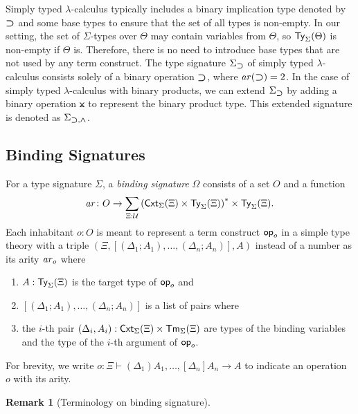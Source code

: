\documentclass[acmsmall,screen]{acmart}
\theoremstyle{acmdefinition}
\newtheorem{remark}[theorem]{Remark}}
\begin{document}
\begin{example}\label{ex:implication}
  Simply typed $\lambda$-calculus typically includes a binary implication type denoted by $\mathbin{\bm{\supset}}$ and some base types to ensure that the set of all types is non-empty.
  In our setting, the set of $\Sigma$-types over $\Theta$ may contain variables from $\Theta$, so $\mathsf{Ty}_{\Sigma}(\Theta)$ is non-empty if $\Theta$ is.
  Therefore, there is no need to introduce base types that are not used by any term construct.
  The type signature $\Sigma_{\mathbin{\bm{\supset}}}$ of simply typed $\lambda$-calculus consists solely of a binary operation $\mathbin{\bm{\supset}}$, where $\mathit{ar}(\mathbin{\bm{\supset}}) = 2$.
  In the case of simply typed $\lambda$-calculus with binary products, we can extend $\Sigma_{\mathbin{\bm{\supset}}}$ by adding a binary operation $\btimes$ to represent the binary product type.
  This extended signature is denoted as $\Sigma_{\mathbin{\bm{\supset}}, \mathbin{\bm{\wedge}}}$.
\end{example}


\subsection{Binding Signatures}
\begin{definition}\label{def:binding-signature}
  For a type signature $\Sigma$, a \emph{binding signature} $\Omega$ consists of a set $O$ and a function
  \[
    \mathit{ar}\colon O \to \sum_{\Xi : \mathcal{U}} \left(\mathsf{Cxt}_\Sigma(\Xi) \times \mathsf{Ty}_\Sigma(\Xi)\right)^* \times \mathsf{Ty}_\Sigma(\Xi).
  \]
  Each inhabitant $o: O$ is meant to represent a term construct $\mathsf{op}_o$ in a simple type theory with a triple $\left(\Xi, \left[\left(\Delta_1; A_1\right), \ldots, \left(\Delta_{n}; A_{n}\right) \right], A\right)$
  instead of a number as its arity $\mathit{ar}_o$ where
  \begin{enumerate}
    \item $A : \mathsf{Ty}_\Sigma(\Xi)$ is the target type of $\mathsf{op}_o$ and
    \item $\left[\left(\Delta_1; A_{1}\right), \ldots, \left(\Delta_{n}; A_{n}\right) \right]$ is a list of pairs where
    \item the $i$-th pair $(\Delta_i, A_i) :\mathsf{Cxt}_{\Sigma}(\Xi) \times \mathsf{Tm}_{\Sigma}(\Xi)$ are types of the binding variables and the type of the $i$-th argument of $\mathsf{op}_{o}$.
  \end{enumerate}
  For brevity, we write $o \colon \Xi \vdash (\Delta_1)A_{1}, \ldots, \left[\Delta_{n}\right] A_{n} \to A$ to indicate an operation $o$ with its arity. 
\end{definition}
\begin{remark}[Terminology on binding signature]
  \cite{Aczel1978,Fiore2010}
\end{remark}
\end{document}
